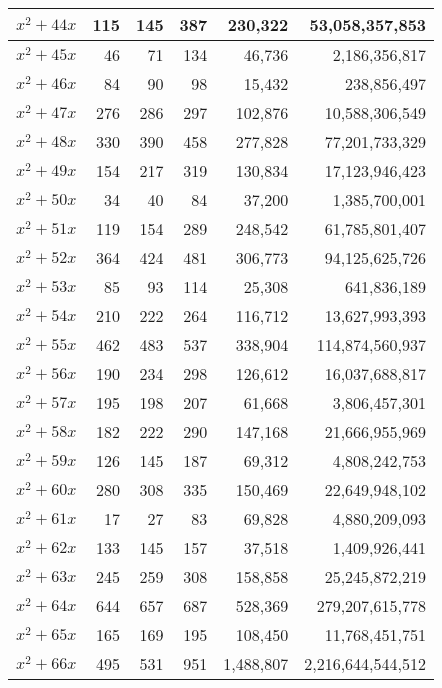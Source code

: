 \documentclass[a4paper]{amsproc}
\theoremstyle{plain}
\theoremstyle{named}
\begin{document}
\begin{longtable}{ | l | r | r | r | r | r | }
$x^2 + 44x$ & 115 & 145 & 387 & 230{,}322 & 53{,}058{,}357{,}853 \\ \hline
$x^2 + 45x$ & 46 & 71 & 134 & 46{,}736 & 2{,}186{,}356{,}817 \\ \hline
$x^2 + 46x$ & 84 & 90 & 98 & 15{,}432 & 238{,}856{,}497 \\ \hline
$x^2 + 47x$ & 276 & 286 & 297 & 102{,}876 & 10{,}588{,}306{,}549 \\ \hline
$x^2 + 48x$ & 330 & 390 & 458 & 277{,}828 & 77{,}201{,}733{,}329 \\ \hline
$x^2 + 49x$ & 154 & 217 & 319 & 130{,}834 & 17{,}123{,}946{,}423 \\ \hline
$x^2 + 50x$ & 34 & 40 & 84 & 37{,}200 & 1{,}385{,}700{,}001 \\ \hline
$x^2 + 51x$ & 119 & 154 & 289 & 248{,}542 & 61{,}785{,}801{,}407 \\ \hline
$x^2 + 52x$ & 364 & 424 & 481 & 306{,}773 & 94{,}125{,}625{,}726 \\ \hline
$x^2 + 53x$ & 85 & 93 & 114 & 25{,}308 & 641{,}836{,}189 \\ \hline
$x^2 + 54x$ & 210 & 222 & 264 & 116{,}712 & 13{,}627{,}993{,}393 \\ \hline
$x^2 + 55x$ & 462 & 483 & 537 & 338{,}904 & 114{,}874{,}560{,}937 \\ \hline
$x^2 + 56x$ & 190 & 234 & 298 & 126{,}612 & 16{,}037{,}688{,}817 \\ \hline
$x^2 + 57x$ & 195 & 198 & 207 & 61{,}668 & 3{,}806{,}457{,}301 \\ \hline
$x^2 + 58x$ & 182 & 222 & 290 & 147{,}168 & 21{,}666{,}955{,}969 \\ \hline
$x^2 + 59x$ & 126 & 145 & 187 & 69{,}312 & 4{,}808{,}242{,}753 \\ \hline
$x^2 + 60x$ & 280 & 308 & 335 & 150{,}469 & 22{,}649{,}948{,}102 \\ \hline
$x^2 + 61x$ & 17 & 27 & 83 & 69{,}828 & 4{,}880{,}209{,}093 \\ \hline
$x^2 + 62x$ & 133 & 145 & 157 & 37{,}518 & 1{,}409{,}926{,}441 \\ \hline
$x^2 + 63x$ & 245 & 259 & 308 & 158{,}858 & 25{,}245{,}872{,}219 \\ \hline
$x^2 + 64x$ & 644 & 657 & 687 & 528{,}369 & 279{,}207{,}615{,}778 \\ \hline
$x^2 + 65x$ & 165 & 169 & 195 & 108{,}450 & 11{,}768{,}451{,}751 \\ \hline
$x^2 + 66x$ & 495 & 531 & 951 & 1{,}488{,}807 & 2{,}216{,}644{,}544{,}512 \\ \hline

\end{longtable}
\end{document}
